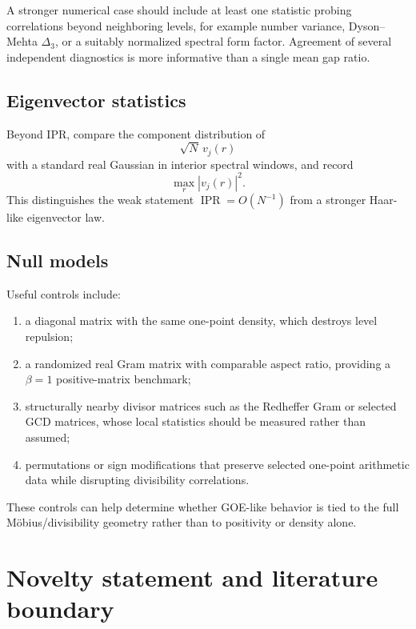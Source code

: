 \documentclass[11pt]{amsart}
\numberwithin{equation}{section}
\theoremstyle{plain}
\theoremstyle{definition}
\theoremstyle{remark}
\newcommand{\IPR}{\operatorname{IPR}}
\begin{document}
A stronger numerical case should include at least one statistic probing correlations beyond neighboring levels, for example number variance, Dyson--Mehta $\Delta_3$, or a suitably normalized spectral form factor.  Agreement of several independent diagnostics is more informative than a single mean gap ratio.

\subsection{Eigenvector statistics}
\label{subsec:eigenvector_protocol}

Beyond IPR, compare the component distribution of
\begin{equation}
\sqrt N\,v_j(r)
\label{eq:scaled_eigenvector_component}
\end{equation}
with a standard real Gaussian in interior spectral windows, and record
\begin{equation}
\max_r |v_j(r)|^2.
\label{eq:eigenvector_sup_norm}
\end{equation}
This distinguishes the weak statement $\IPR=O(N^{-1})$ from a stronger Haar-like eigenvector law.

\subsection{Null models}
\label{subsec:null_models}

Useful controls include:
\begin{enumerate}[label=(\roman*)]
\item a diagonal matrix with the same one-point density, which destroys level repulsion;
\item a randomized real Gram matrix with comparable aspect ratio, providing a $\beta=1$ positive-matrix benchmark;
\item structurally nearby divisor matrices such as the Redheffer Gram or selected GCD matrices, whose local statistics should be measured rather than assumed;
\item permutations or sign modifications that preserve selected one-point arithmetic data while disrupting divisibility correlations.
\end{enumerate}
These controls can help determine whether GOE-like behavior is tied to the full M\"obius/divisibility geometry rather than to positivity or density alone.

\section{Novelty statement and literature boundary}
\label{sec:novelty_boundary}
\end{document}
